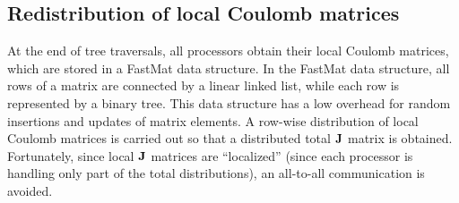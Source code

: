 \commentoutA{\documentclass[prl,aps,twocolumn,twocolumngrid,superbib]{revtex4}}
\begin{document}
\subsection{Redistribution of local Coulomb matrices}
At the end of tree traversals, all processors obtain their local Coulomb matrices, which
are stored in a FastMat\cite{CGan03} data structure. In the FastMat data structure, all rows 
of a matrix are connected by a linear linked list, while each row is represented by a binary
tree. This data structure has a low overhead for random insertions and updates of 
matrix elements. A row-wise distribution of local Coulomb matrices is
carried out so that a distributed total ${\bf J}$ matrix is obtained. Fortunately,
since local ${\bf J}$ matrices are ``localized'' (since each processor 
is handling only part of the total distributions), an all-to-all communication is
avoided.

\end{document}
